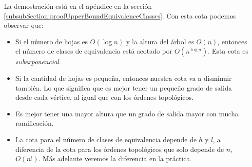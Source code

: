 La demostración está en el apéndice en la sección \ref{subsubSection:proofUpperBoundEquivalenceClasses}. Con esta cota podemos observar que: 
\begin{itemize}
	\item Si el número de hojas es $O(\log n)$ y la altura del árbol es $O(n)$, entonces el número de clases de equivalencia está acotado por $O(n^{\log n})$. Esta cota es \emph{subexponencial}. %
	\item Si la cantidad de hojas es pequeña, entonces nuestra cota va a disminuir también. Lo que significa que es mejor tener un pequeño grado de salida desde cada vértice, al igual que con los órdenes topológicos. %
	\item Es mejor tener una mayor altura que un grado de salida mayor con mucha ramificación.
	\item La cota para el número de clases de equivalencia depende de $h$ y $l$, a diferencia de la cota para los órdenes topológicos que solo depende de $n$, $O(n!)$. Más adelante veremos la diferencia en la práctica.
\end{itemize}
